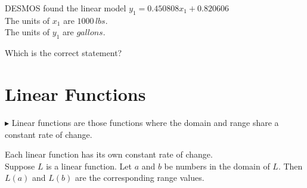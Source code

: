 \documentclass{ximera}
\begin{document}
\begin{question}


DESMOS found the linear model $y_1 = 0.450808 x_1 + 0.820606$ \\


The units of $x_1$ are $1000 \, lbs$. \\
The units of $y_1$ are $gallons$.



Which is the correct statement?

\begin{multipleChoice}
\end{multipleChoice}


\end{question}





























\section*{Linear Functions}

















$\blacktriangleright$  Linear functions are those functions where the domain and range share a constant rate of change.  





Each linear function has its own constant rate of change. \\


Suppose $L$ is a linear function.  Let $a$ and $b$ be numbers in the domain of $L$.  Then $L(a)$ and $L(b)$ are the corresponding range values.
\end{document}
